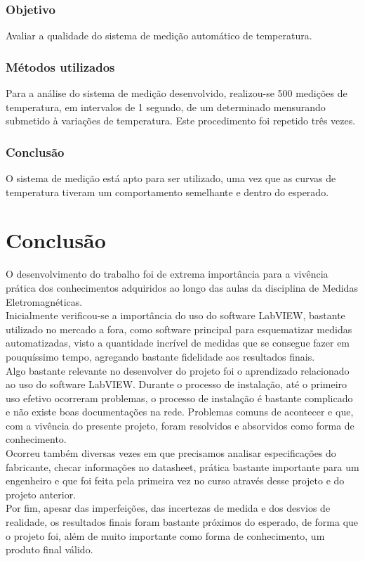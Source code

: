 \documentclass[14pt, oneside]{book}
\newcommand\tab[1][1cm]{\hspace*{#1}}
\theoremstyle{definition}
\begin{document}
                \subsection{Objetivo}
                    \tab Avaliar a qualidade do sistema de medição automático de temperatura.
                \subsection{Métodos utilizados}
                    \tab Para a análise do sistema de medição desenvolvido, realizou-se 500 medições de temperatura, em intervalos de 1 segundo, de um determinado mensurando submetido à variações de temperatura. Este procedimento foi repetido três vezes.
                 \subsection{Conclusão}
                    \tab O sistema de medição está apto para ser utilizado, uma vez que as curvas de temperatura tiveram um comportamento semelhante e dentro do esperado. \\
                

        \chapter{Conclusão}
            \tab O desenvolvimento do trabalho foi de extrema importância para a vivência prática dos conhecimentos adquiridos ao longo das aulas da disciplina de Medidas Eletromagnéticas. \\
            \tab Inicialmente verificou-se a importância do uso do software LabVIEW, bastante utilizado no mercado a fora, como software principal para esquematizar medidas automatizadas, visto a quantidade incrível de medidas que se consegue fazer em pouquíssimo tempo, agregando bastante fidelidade aos resultados finais. \\
            \tab Algo bastante relevante no desenvolver do projeto foi o aprendizado relacionado ao uso do software LabVIEW. Durante o processo de instalação, até o primeiro uso efetivo ocorreram problemas, o processo de instalação é bastante complicado e não existe boas documentações na rede. Problemas comuns de acontecer e que, com a vivência do presente projeto, foram resolvidos e absorvidos como forma de conhecimento. \\
            \tab Ocorreu também diversas vezes em que precisamos analisar especificações do fabricante, checar informações no datasheet, prática bastante importante para um engenheiro e que foi feita pela primeira vez no curso através desse projeto e do projeto anterior. \\
            \tab Por fim, apesar das imperfeições, das incertezas de medida e dos desvios de realidade, os resultados finais foram bastante próximos do esperado, de forma que o projeto foi, além de muito importante como forma de conhecimento, um produto final válido.
            
                
                
\end{document}
